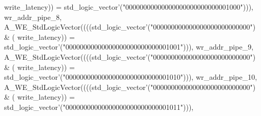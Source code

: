 \begin{DoxyCode}
{      write_latency}\textcolor{vhdlchar}{)}\textcolor{vhdlchar}{)} \textcolor{vhdlchar}{=} \textcolor{comment}{std\_logic\_vector}\textcolor{vhdlchar}{'}\textcolor{vhdlchar}{(}\textcolor{vhdllogic}{"00000000000000000000000000001000"}\textcolor{vhdlchar}{)}\textcolor{vhdlchar}{)}\textcolor{vhdlchar}{)}\textcolor{vhdlchar}{,} \textcolor{vhdlchar}{
      wr_addr_pipe_8}\textcolor{vhdlchar}{,} \textcolor{vhdlchar}{A\_WE\_StdLogicVector}\textcolor{vhdlchar}{(}\textcolor{vhdlchar}{(}\textcolor{vhdlchar}{(}\textcolor{vhdlchar}{(}\textcolor{comment}{std\_logic\_vector}\textcolor{vhdlchar}{'}\textcolor{vhdlchar}{(}\textcolor{vhdllogic}{"000000000000000000000000000"}\textcolor{vhdlchar}{)} \textcolor{vhdlchar}{&} \textcolor{vhdlchar}{(}\textcolor{vhdlchar}{
      write_latency}\textcolor{vhdlchar}{)}\textcolor{vhdlchar}{)} \textcolor{vhdlchar}{=} \textcolor{comment}{std\_logic\_vector}\textcolor{vhdlchar}{'}\textcolor{vhdlchar}{(}\textcolor{vhdllogic}{"00000000000000000000000000001001"}\textcolor{vhdlchar}{)}\textcolor{vhdlchar}{)}\textcolor{vhdlchar}{)}\textcolor{vhdlchar}{,} \textcolor{vhdlchar}{
      wr_addr_pipe_9}\textcolor{vhdlchar}{,} \textcolor{vhdlchar}{A\_WE\_StdLogicVector}\textcolor{vhdlchar}{(}\textcolor{vhdlchar}{(}\textcolor{vhdlchar}{(}\textcolor{vhdlchar}{(}\textcolor{comment}{std\_logic\_vector}\textcolor{vhdlchar}{'}\textcolor{vhdlchar}{(}\textcolor{vhdllogic}{"000000000000000000000000000"}\textcolor{vhdlchar}{)} \textcolor{vhdlchar}{&} \textcolor{vhdlchar}{(}\textcolor{vhdlchar}{
      write_latency}\textcolor{vhdlchar}{)}\textcolor{vhdlchar}{)} \textcolor{vhdlchar}{=} \textcolor{comment}{std\_logic\_vector}\textcolor{vhdlchar}{'}\textcolor{vhdlchar}{(}\textcolor{vhdllogic}{"00000000000000000000000000001010"}\textcolor{vhdlchar}{)}\textcolor{vhdlchar}{)}\textcolor{vhdlchar}{)}\textcolor{vhdlchar}{,} \textcolor{vhdlchar}{
      wr_addr_pipe_10}\textcolor{vhdlchar}{,} \textcolor{vhdlchar}{A\_WE\_StdLogicVector}\textcolor{vhdlchar}{(}\textcolor{vhdlchar}{(}\textcolor{vhdlchar}{(}\textcolor{vhdlchar}{(}\textcolor{comment}{std\_logic\_vector}\textcolor{vhdlchar}{'}\textcolor{vhdlchar}{(}\textcolor{vhdllogic}{"000000000000000000000000000"}\textcolor{vhdlchar}{)} \textcolor{vhdlchar}{&} \textcolor{vhdlchar}{(}\textcolor{vhdlchar}{
      write_latency}\textcolor{vhdlchar}{)}\textcolor{vhdlchar}{)} \textcolor{vhdlchar}{=} \textcolor{comment}{std\_logic\_vector}\textcolor{vhdlchar}{'}\textcolor{vhdlchar}{(}\textcolor{vhdllogic}{"00000000000000000000000000001011"}\textcolor{vhdlchar}{)}\textcolor{vhdlchar}{)}\textcolor{vhdlchar}{)}\textcolor{vhdlchar}{,} \textcolor{vhdlchar}{
}
\end{DoxyCode}
